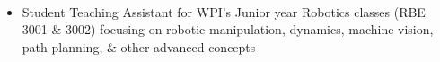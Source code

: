 \divider \\
    \begin{itemize}
        \item Student Teaching Assistant for WPI’s Junior year Robotics classes (RBE 3001 \& 3002) focusing on robotic manipulation, dynamics, machine vision, path-planning, \& other advanced concepts
    \end{itemize}

